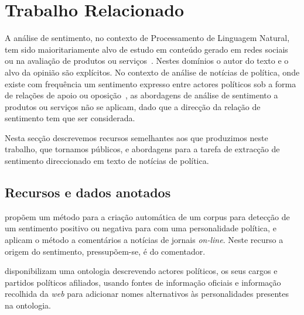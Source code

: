\documentclass[a4paper, twocolumn, 11pt, twoside]{article}
\begin{document}
\section{Trabalho Relacionado}
\label{sec_related_work}
A análise de sentimento, no contexto de Processamento de Linguagem Natural, tem sido maioritariamente alvo de estudo em conteúdo gerado em redes sociais~\citep{10.1145/3185045} ou na avaliação de produtos ou serviços~\citep{pontiki-etal-2016-semeval}. Nestes domínios o autor do texto e o alvo da opinião são explícitos. No contexto de análise de notícias de política, onde existe com frequência um sentimento expresso entre actores políticos sob a forma de relações de apoio ou oposição~\citep{balahur2009opinion, balahur-etal-2010-sentiment}, as abordagens de análise de sentimento a produtos ou serviços não se aplicam, dado que a direcção da relação de sentimento tem que ser considerada.

Nesta secção descrevemos recursos semelhantes aos que produzimos neste trabalho, que tornamos públicos, e abordagens para a tarefa de extracção de sentimento direccionado em texto de notícias de política.

\subsection{Recursos e dados anotados}


\cite{10.1145/1651461.1651468} propõem um método para a criação automática de um corpus para detecção de um sentimento positivo ou negativa para com uma personalidade política, e aplicam o método a comentários a notícias de jornais \textit{on-line}. Neste recurso a origem do sentimento, pressupõem-se, é do comentador.

\cite{moreira2013tracking} disponibilizam uma ontologia descrevendo actores políticos, os seus cargos e partidos políticos afiliados, usando fontes de informação oficiais e informação recolhida da \textit{web} para adicionar nomes alternativos às personalidades presentes na ontologia.
\end{document}
